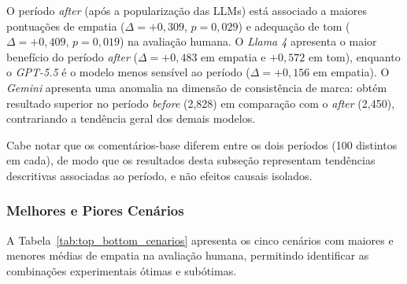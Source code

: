\documentclass[12pt, a4paper]{article}
\numberwithin{equation}{section}
\begin{document}
O período \textit{after} (após a popularização das LLMs) está associado a maiores pontuações de empatia ($\Delta = +0{,}309$, $p = 0{,}029$) e adequação de tom ($\Delta = +0{,}409$, $p = 0{,}019$) na avaliação humana. O \textit{Llama 4} apresenta o maior benefício do período \textit{after} ($\Delta = +0{,}483$ em empatia e $+0{,}572$ em tom), enquanto o \textit{GPT-5.5} é o modelo menos sensível ao período ($\Delta = +0{,}156$ em empatia). O \textit{Gemini} apresenta uma anomalia na dimensão de consistência de marca: obtém resultado superior no período \textit{before} (2,828) em comparação com o \textit{after} (2,450), contrariando a tendência geral dos demais modelos.

Cabe notar que os comentários-base diferem entre os dois períodos (100 distintos em cada), de modo que os resultados desta subseção representam tendências descritivas associadas ao período, e não efeitos causais isolados.

\subsubsection{Melhores e Piores Cenários}

A Tabela~\ref{tab:top_bottom_cenarios} apresenta os cinco cenários com maiores e menores médias de empatia na avaliação humana, permitindo identificar as combinações experimentais ótimas e subótimas.
\end{document}

